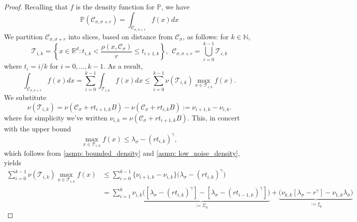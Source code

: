 \documentclass{article}
\newcommand{\set}[1]{\left\{#1\right\}}
\newcommand{\N}{\mathbb{N}}
\newcommand{\Reals}{\mathbb{R}}
\newcommand{\Rd}{\Reals^d}
\newcommand{\1}{\mathbf{1}}
\newcommand{\Pbb}{\mathbb{P}}
\newcommand{\Cset}{\mathcal{C}}
\newcommand{\Csig}{\Cset_{\sigma}}
\newcommand{\Csigr}{\Cset_{\sigma,\sigma + r}}
\theoremstyle{aldenthm}
\begin{document}
\begin{proof}
	Recalling that $f$ is the density function for $\Pbb$, we have
	\begin{equation}
	\label{eqn: integral_over_epsilon_neighborhood}
	\Pbb(\Csigr) = \int_{\Csigr} f(x) dx
	\end{equation}
	We partition $\Csigr$ into slices, based on distance from $\Csig$, as follows: for $k \in \N$,
	\begin{equation*}
	\mathcal{T}_{i,k} = \set{x \in \Rd: t_{i,k} < \frac{\rho(x, \Csig)}{r} \leq t_{i+1,k}}, ~~ \Csigr = \bigcup_{i = 0}^{k-1} \mathcal{T}_{i,k}
	\end{equation*}
	where $t_i = i/k$ for $i = 0, \ldots, k - 1$. As a result,
	\begin{equation*}
	\int_{\Csigr} f(x) dx = \sum_{i = 0}^{k-1} \int_{\mathcal{T}_{i,k}} f(x) dx \leq \sum_{i = 0}^{k-1} \nu(\mathcal{T}_{i,k}) \max_{x \in \mathcal{T}_{i,k}} f(x).
	\end{equation*}
	We substitute
	\begin{equation*}
	\nu(\mathcal{T}_{i,k}) = \nu(\Csig + rt_{i+1,k}B) - \nu(\Csig + rt_{i,k}B) := \nu_{i+1,k} - \nu_{i,k}. 
	\end{equation*}
	where for simplicity we've written $\nu_{i,k} = \nu(\Csig + rt_{i+1,k}B)$.
	This, in concert with the upper bound
	\begin{equation*}
	\max_{x \in \mathcal{T}_{i,k}} f(x) \leq \lambda_{\sigma} - (rt_{i,k})^{\gamma},
	\end{equation*}
	which follows from \ref{asmp: bounded_density} and \ref{asmp: low_noise_density}, yields
	\begin{align}
	\label{eqn: telescoping_sum}
	\sum_{i = 0}^{k-1} \nu(\mathcal{T}_{i,k}) \max_{x \in \mathcal{T}_{i,k}} f(x) & \leq \sum_{i = 0}^{k-1} \biggl\{ \nu_{i+1,k} - \nu_{i,k} \biggr\} \biggl( \lambda_{\sigma} - (rt_{i,k})^{\gamma} \biggr) \nonumber \\
	& = \sum_{i = 1}^{k} 
	\underbrace{\nu_{i,k} \biggl( \left[\lambda_{\sigma} - (rt_{i,k})^{\gamma}\right] -  \left[\lambda_{\sigma} - (rt_{i-1,k})^{\gamma}\right]\biggr)}_{:= \Sigma_k} + \underbrace{\biggl(\nu_{k,k}\left[\lambda_{\sigma} - r^{\gamma}\right] - \nu_{1,k}\lambda_{\sigma} \biggr)}_{:= \xi_k}
	\end{align}
	

\end{proof}
\end{document}
